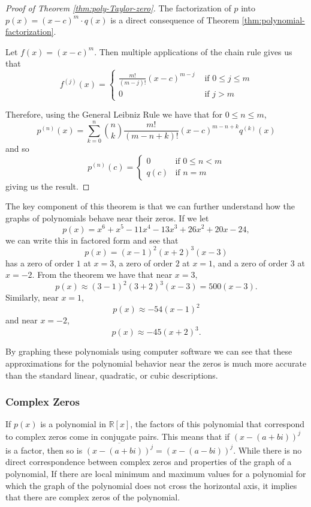 \documentclass[
]{book}
\theoremstyle{definition}
\theoremstyle{definition}
\theoremstyle{definition}
\theoremstyle{definition}
\theoremstyle{remark}
\begin{document}
\begin{proof}[Proof of Theorem \ref{thm:poly-Taylor-zero}]
The factorization of \(p\) into \(p(x)=(x-c)^m \cdot q(x)\) is a direct consequence of Theorem \ref{thm:polynomial-factorization}.

Let \(f(x)=(x-c)^m\). Then multiple applications of the chain rule gives us that
\[f^{(j)}(x) = \begin{cases}
 \frac{m!}{(m-j)!} (x-c)^{m-j} & \mbox{ if } 0 \leq j \leq m \\
0 & \mbox{ if } j>m 
\end{cases}\]

Therefore, using the General Leibniz Rule we have that for \(0\leq n \leq m\),
\[p^{(n)}(x) = \sum_{k=0}^n \binom{n}{k} \frac{m!}{(m-n+k)!} (x-c)^{m-n+k} q^{(k)}(x)\] and so
\[p^{(n)}(c) = 
\begin{cases}
0 & \mbox{if } 0 \leq n < m\\
q(c) & \mbox{if } n=m   
\end{cases}\]
giving us the result.
\end{proof}

The key component of this theorem is that we can further understand how the graphs of polynomials behave near their zeros. If we let \[p(x)=x^6+x^5-11x^4-13x^3+26x^2+20x-24,\] we can write this in factored form and see that \[p(x)=(x-1)^2(x+2)^3(x-3)\] has a zero of order \(1\) at \(x=3\), a zero of order \(2\) at \(x=1\), and a zero of order \(3\) at \(x=-2\). From the theorem we have that near \(x=3\), \[p(x) \approx (3-1)^2(3+2)^3(x-3) = 500 (x-3).\] Similarly, near \(x=1\), \[p(x) \approx -54 (x-1)^2\] and near \(x=-2\), \[p(x)\approx -45 (x+2)^3.\]

By graphing these polynomials using computer software we can see that these approximations for the polynomial behavior near the zeros is much more accurate than the standard linear, quadratic, or cubic descriptions.

\hypertarget{complex-zeros}{%
\subsubsection{Complex Zeros}\label{complex-zeros}}

If \(p(x)\) is a polynomial in \(\mathbb{R}[x]\), the factors of this polynomial that correspond to complex zeros come in conjugate pairs. This means that if \((x-(a+bi))^j\) is a factor, then so is \(\overline{(x-(a+bi))^j}= (x-(a-bi))^j\). While there is no direct correspondence between complex zeros and properties of the graph of a polynomial, If there are local minimum and maximum values for a polynomial for which the graph of the polynomial does not cross the horizontal axis, it implies that there are complex zeros of the polynomial.
\end{document}
